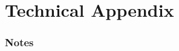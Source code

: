 \documentclass[envcountsame]{llncs}
\begin{document}
                




\newpage
\appendix
\section*{Technical Appendix}

\setcounter{figure}{0}
\renewcommand{\thefigure}{A.\arabic{figure}}
\setcounter{theorem}{0}
\renewcommand{\thetheorem}{A.\arabic{theorem}}
\setcounter{lemma}{0}
\renewcommand{\thelemma}{A.\arabic{lemma}}



\subsubsection{Notes}
\end{document}
